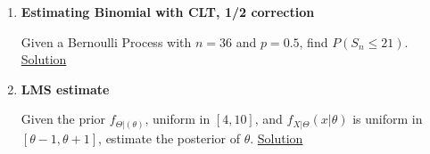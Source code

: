 \documentclass[11pt, a4paper]{article}
\begin{document}
\begin{enumerate}
    \item \hypertarget{q_binclt}{\textbf{Estimating Binomial with CLT, 1/2 correction}}\newline
    Given a Bernoulli Process with $n = 36$ and $p = 0.5$, find $P(S_{n} \leq 21)$. \hyperlink{a_binclt}{Solution}

    \item \hypertarget{q_lmsestimate}{\textbf{LMS estimate}}\newline
    Given the prior $f_{\Theta|(\theta)}$, uniform in $[4,10]$, and $f_{X|\Theta}(x|\theta)$ is uniform in $[\theta-1, \theta+1]$, estimate the posterior of $\theta$. \hyperlink{a_lmsestimate}{Solution}

    \end{enumerate}
\end{document}
